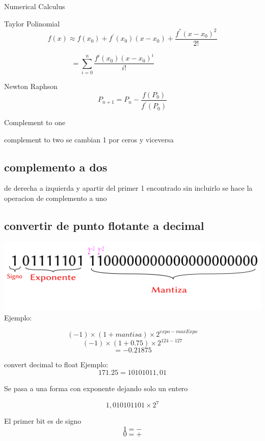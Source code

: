 \newpage
\begin{section}{Numerical Calculus}
\begin{subsection}{Taylor Polinomial}
$$f(x) \approx f(x_0) + f^{'}(x_0)(x-x_0) + \frac{f^{''}(x-x_0)^2}{2!}$$

$$= \sum\limits_{i=0}^{n} \frac{f^{i}(x_0)(x-x_0)^i } {i!} \;\;\;\;\;\;\;\;\;\;\;\;\;\;\;\;\;\;\;\;$$

\end{subsection}
\begin{subsection}{Newton Raphson}
$$ P_{n+1} = P_n - \frac{f(P_0)}{f^{'}(P_0)} $$

\end{subsection}
\begin{subsection}{Complement to one}

\end{subsection}
\begin{subsection}{complement to two }
se cambian 1 por ceros y viceversa
\subsection{complemento a dos}
de derecha a izquierda y apartir del primer 1 encontrado sin incluirlo se 
hace la operacion de complemento a uno
\subsection{convertir de punto flotante a decimal}
\includegraphics[scale = 0.5]{1.png}
Ejemplo:

$$(-1) \times (1+mantisa) \times {2^{expo - maxExpo} } $$
$$(-1) \times (1+0.75) \times 2^{124-127} $$
$$ = -0.21875$$

\end{subsection}
\newpage
\begin{subsection}{convert decimal to float}
Ejemplo:
$$171.25 = 10101011,01$$

Se pasa a una forma con exponente dejando solo un entero

$$1,010101101 \times 2^7 $$

El primer bit es de signo $$1 = -$$ $$0 = +$$


\end{subsection}
\end{section}

